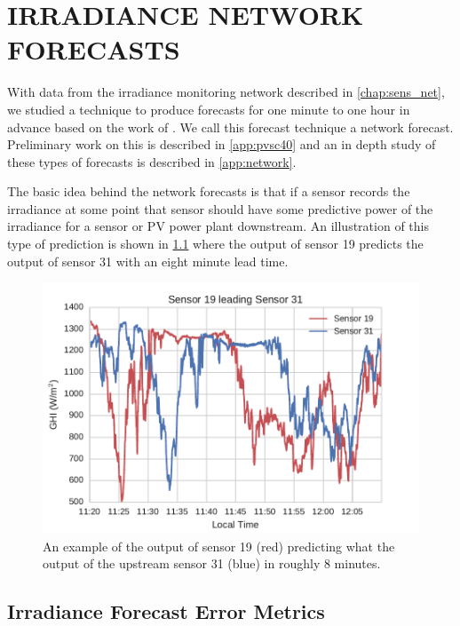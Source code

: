 \chapter{IRRADIANCE NETWORK FORECASTS}
\label{chap:network}

With data from the irradiance monitoring network described in
\cref{chap:sens_net}, we studied a technique to produce forecasts for
one minute to one hour in advance based on the work of
\cite{Lonij2013}.
We call this forecast technique a network forecast.
Preliminary work on this is described in \cref{app:pvsc40} and an in
depth study of these types of forecasts is described in
\cref{app:network}.

The basic idea behind the network forecasts is that if a sensor
records the irradiance at some point that sensor should have some
predictive power of the irradiance for a sensor or PV power plant
downstream.
An illustration of this type of prediction is shown in
\cref{fig:leading_sens} where the output of sensor 19 predicts the
output of sensor 31 with an eight minute lead time.

\begin{figure}[bht]
\includegraphics[width=\textwidth]{figs/leading_sens.pdf}
\caption[Example of data from one sensor predicting the output of
another]{An example of the output of sensor 19 (red) predicting what
  the output of the upstream sensor 31 (blue) in roughly 8
  minutes.}
\label{fig:leading_sens}
\end{figure}

\section{Irradiance Forecast Error Metrics}
\label{sec:error_metrics}

